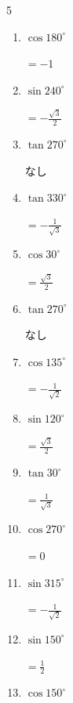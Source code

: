 \begin{multicols}{5}
\begin{enumerate}
        $\displaystyle =-\frac{\sqrt{3}}{2}$

  \item $\displaystyle \cos{180^\circ}$

        $\displaystyle =-1$

  \item $\displaystyle \sin{240^\circ}$

        $\displaystyle =-\frac{\sqrt{3}}{2}$

  \item $\displaystyle \tan{270^\circ}$

        $\displaystyle なし$

  \item $\displaystyle \tan{330^\circ}$

        $\displaystyle =-\frac{1}{\sqrt{3}}$

  \item $\displaystyle \cos{30^\circ}$

        $\displaystyle =\frac{\sqrt{3}}{2}$

  \item $\displaystyle \tan{270^\circ}$

        $\displaystyle なし$

  \item $\displaystyle \cos{135^\circ}$

        $\displaystyle =-\frac{1}{\sqrt{2}}$

\columnbreak %

  \item $\displaystyle \sin{120^\circ}$

        $\displaystyle =\frac{\sqrt{3}}{2}$

  \item $\displaystyle \tan{30^\circ}$

        $\displaystyle =\frac{1}{\sqrt{3}}$

  \item $\displaystyle \cos{270^\circ}$

        $\displaystyle =0$

  \item $\displaystyle \sin{315^\circ}$

        $\displaystyle =-\frac{1}{\sqrt{2}}$

  \item $\displaystyle \sin{150^\circ}$

        $\displaystyle =\frac{1}{2}$

  \item $\displaystyle \cos{150^\circ}$


\end{enumerate}
\end{multicols}

